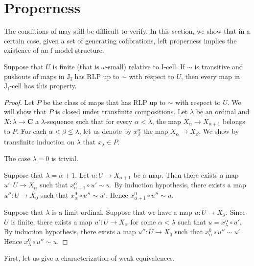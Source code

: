 \documentclass{amsart}
\theoremstyle{definition}
\newcommand{\cat}[1]{\mathbf{#1}}
\newcommand{\C}{\cat{C}}
\newcommand{\I}{\mathrm{I}}
\newcommand{\J}{\mathrm{J}}
\newcommand{\class}[2]{#1\text{-}\mathrm{#2}}
\newcommand{\Icell}[1][\I]{\class{#1}{cell}}
\newcommand{\Jcell}[1][]{\Icell[\J#1]}
\begin{document}
\section{Properness}

The conditions of  may still be difficult to verify.
In this section, we show that in a certain case, given a set of generating cofibrations,
left properness implies the existence of an f-model structure.

\begin{lem}[j-transfinite]
Suppose that $U$ is finite (that is $\omega$-small) relative to $\Icell$.
If $\sim$ is transitive and pushouts of maps in $\J_\I$ has RLP up to $\sim$ with respect to $U$, then every map in $\Jcell[_\I]$ has this property.
\end{lem}
\begin{proof}
Let $P$ be the class of maps that has RLP up to $\sim$ with respect to $U$.
We will show that $P$ is closed under transfinite compositions.
Let $\lambda$ be an ordinal and $X : \lambda \to \C$ a $\lambda$-sequence such that
for every $\alpha < \lambda$, the map $X_\alpha \to X_{\alpha + 1}$ belongs to $P$.
For each $\alpha < \beta \leq \lambda$, let us denote by $x^\alpha_\beta$ the map $X_\alpha \to X_\beta$.
We show by transfinite induction on $\lambda$ that $x_\lambda \in P$.

The case $\lambda = 0$ is trivial.

Suppose that $\lambda = \alpha + 1$.
Let $u : U \to X_{\alpha + 1}$ be a map.
Then there exists a map $u' : U \to X_\alpha$ such that $x^\alpha_{\alpha + 1} \circ u' \sim u$.
By induction hypothesis, there exists a map $u'' : U \to X_0$ such that $x^0_\alpha \circ u'' \sim u'$.
Hence $x^0_{\alpha + 1} \circ u'' \sim u$.

Suppose that $\lambda$ is a limit ordinal. 
Suppose that we have a map $u : U \to X_\lambda$.
Since $U$ is finite, there exists a map $u' : U \to X_\alpha$ for
some $\alpha < \lambda$ such that $u = x^\alpha_\lambda \circ u'$.
By induction hypothesis, there exists a map $u'' : U \to X_0$ such that $x^0_\alpha \circ u'' \sim u'$.
Hence $x^0_\lambda \circ u'' \sim u$.
\end{proof}

First, let us give a characterization of weak equivalences.
\end{document}
